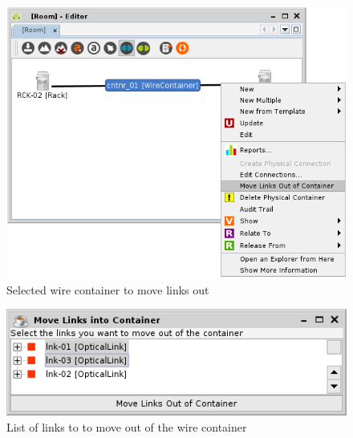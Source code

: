 \documentclass[a4paper]{article}
\begin{document}
				\begin{figure}[h!]
					\centering
					\includegraphics[width=0.6\linewidth]{img/l1_selected_container_to_move_links_out.png}
					\caption{Selected wire container to move links out}
					\label{fig:l1_selected_container_to_move_links_out}
				\end{figure}	
			
				\begin{figure}[h!]
					\centering
					\includegraphics[width=0.6\linewidth]{img/l1_list_of_links_to_move.png}
					\caption{List of links to to move out of the wire container}
					\label{fig:l1_list_of_links_to_move}
				\end{figure}
	
\end{document}
